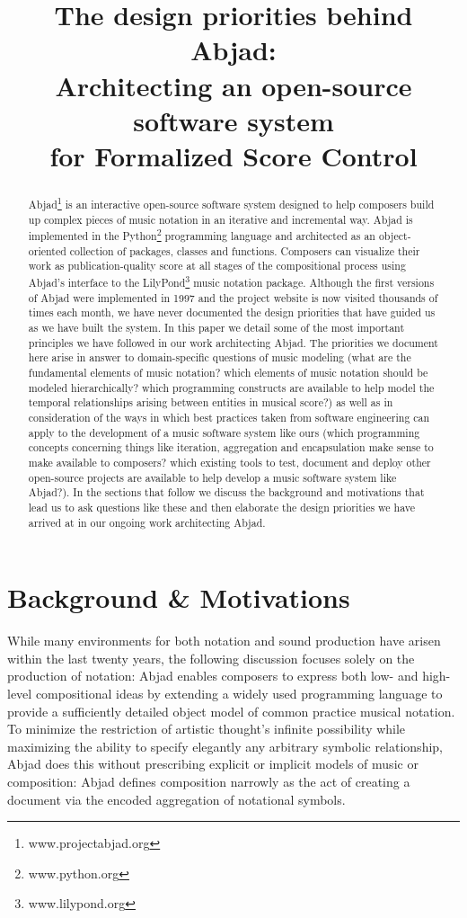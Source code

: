 \documentclass{article}
\title{The design priorities behind Abjad: \\ 
Architecting an open-source software system \\
for Formalized Score Control}
\begin{document}
\capstartfalse
\maketitle
\capstarttrue

\begin{abstract}
Abjad\footnote{www.projectabjad.org} is an interactive open-source software
system designed to help composers build up complex pieces of music notation in
an iterative and incremental way.  Abjad is implemented in the
Python\footnote{www.python.org} programming language and architected as an
object-oriented collection of packages, classes and functions. Composers can
visualize their work as publication-quality score at all stages of the
compositional process using Abjad's interface to the
LilyPond\footnote{www.lilypond.org} music notation package. Although the first
versions of Abjad were implemented in 1997 and the project website is now
visited thousands of times each month, we have never documented the design
priorities that have guided us as we have built the system. In this paper we
detail some of the most important principles we have followed in our work
architecting Abjad. The priorities we document here arise in answer to
domain-specific questions of music modeling (what are the fundamental elements
of music notation? which elements of music notation should be modeled
hierarchically? which programming constructs are available to help model the
temporal relationships arising between entities in musical score?) as well as
in consideration of the ways in which best practices taken from software
engineering can apply to the development of a music software system like ours
(which programming concepts concerning things like iteration, aggregation and
encapsulation make sense to make available to composers? which existing tools
to test, document and deploy other open-source projects are available to help
develop a music software system like Abjad?). In the sections that follow we
discuss the background and motivations that lead us to ask questions like these
and then elaborate the design priorities we have arrived at in our ongoing work
architecting Abjad.
\end{abstract}

\section{Background \& Motivations}\label{sec:background}

While many environments for both notation and sound production have arisen
within the last twenty years, the following discussion focuses solely on the
production of notation: Abjad enables composers to express both low- and
high-level compositional ideas by extending a widely used programming language
to provide a sufficiently detailed object model of common practice musical
notation. To minimize the restriction of artistic thought's infinite
possibility while maximizing the ability to specify elegantly any arbitrary
symbolic relationship, Abjad does this without prescribing explicit or implicit
models of music or composition: Abjad defines composition narrowly as the act
of creating a document via the encoded aggregation of notational symbols.
\end{document}
